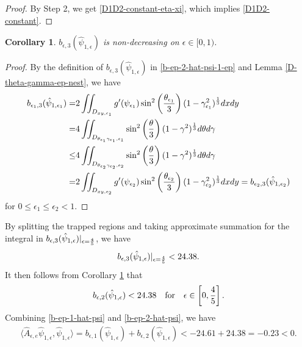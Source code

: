 \documentclass[1 [leqno, 11pt]{amsart}
\numberwithin{equation}{section}
\let\ep=\epsilon
\newtheorem{Corollary}[Theorem]{Corollary}
\begin{document}
\begin{CJK*}{GBK}{song}
\begin{proof}
By Step 2, we get \eqref{D1D2-constant-eta-xi}, which implies \eqref{D1D2-constant}.
\end{proof}
\begin{Corollary}\label{b3-increasing}
$ b_{\ep,3}(\hat{\psi}_{1,\ep})$ is non-decreasing on $\ep\in[0,1)$.
\end{Corollary}
\begin{proof}
By the definition of $ b_{\ep,3}(\hat{\psi}_{1,\ep})$ in \eqref{b-ep-2-hat-psi-1-ep} and Lemma \ref{D-theta-gamma-ep-nest}, we have
\begin{align*}
b_{\ep_1,3}(\hat{\psi}_{1,\ep_1})=
&2\iint_{D_{xy,\ep_1}}g'(\psi_{\ep_1})
\sin^2\left(\frac{\theta_{\ep_1}}{3}\right)(1-\gamma_{\ep_1}^2)^{1\over3}dxdy\\
=&4\iint_{D_{\theta_{\ep_1}\gamma_{\ep_1},\ep_1}}\sin^2\left(\frac{\theta}{3}\right)(1-\gamma^2)^{1\over3}d\theta d\gamma\\
\leq &4\iint_{D_{\theta_{\ep_2}\gamma_{\ep_2},\ep_2}}\sin^2\left(\frac{\theta}{3}\right)(1-\gamma^2)^{1\over3}d\theta d\gamma\\
=&2\iint_{D_{xy,\ep_2}}g'(\psi_{\ep_2})
\sin^2\left(\frac{\theta_{\ep_2}}{3}\right)(1-\gamma_{\ep_2}^2)^{1\over3}dxdy=b_{\ep_2,3}(\hat{\psi}_{1,\ep_2})
\end{align*}
for $0\leq \ep_1\leq \ep_2<1$.
\end{proof}
By   splitting  the trapped regions and taking  approximate summation for the integral in $b_{\ep,3}(\hat{\psi}_{1,\ep})|_{\ep={4\over5}}$, we have
\begin{align*}
b_{\ep,3}(\hat{\psi}_{1,\ep})|_{\ep={4\over5}}<24.38.
\end{align*}
It then follows from Corollary \ref{b3-increasing} that
 \begin{align}\label{b-ep-2-hat-psi}
 b_{\ep, 2}(\hat{\psi}_{1,\ep})<24.38 \quad\text{for}\quad\ep\in\left[0,{4\over5}\right].
 \end{align}
Combining \eqref{b-ep-1-hat-psi} and \eqref{b-ep-2-hat-psi}, we have
\begin{align}\label{test-odd-neg}
\langle\hat{A}_{\ep,e} \hat{\psi}_{1,\ep}, \hat{\psi}_{1,\ep} \rangle= b_{\ep, 1}(\hat{\psi}_{1,\ep}) + b_{\ep, 2}(\hat{\psi}_{1,\ep})<-24.61+24.38 =-0.23< 0.
\end{align}
\medskip


\end{CJK*}
\end{document}
